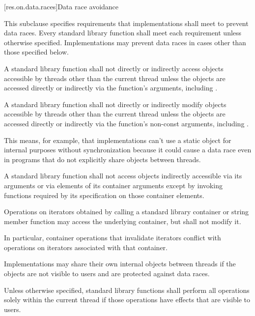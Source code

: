 [res.on.data.races]{Data race avoidance}

\pnum
This subclause specifies requirements that implementations shall meet to prevent data
races.
Every standard library function shall meet each requirement unless otherwise specified.
Implementations may prevent data races in cases other than those specified below.

\pnum
A \Cpp{} standard library function shall not directly or indirectly access
objects accessible by threads other than the current thread
unless the objects are accessed directly or indirectly via the function's arguments,
including .

\pnum
A \Cpp{} standard library function shall not directly or indirectly modify
objects accessible by threads other than the current thread
unless the objects are accessed directly or indirectly via the function's non-const
arguments, including .

\pnum
\begin{note} This means, for example, that implementations can't use a static object for
internal purposes without synchronization because it could cause a data race even in
programs that do not explicitly share objects between threads. \end{note}

\pnum
A \Cpp{} standard library function shall not access objects indirectly accessible via its
arguments or via elements of its container arguments except by invoking functions
required by its specification on those container elements.

\pnum
Operations on iterators obtained by calling a standard library container or string
member function may access the underlying container, but shall not modify it.
\begin{note} In particular, container operations that invalidate iterators conflict
with operations on iterators associated with that container. \end{note}

\pnum
Implementations may share their own internal objects between threads if the objects are
not visible to users and are protected against data races.

\pnum
Unless otherwise specified, \Cpp{} standard library functions shall perform all operations
solely within the current thread if those operations have effects that are
visible to users.

